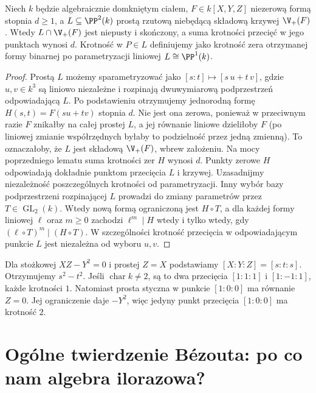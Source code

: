 \begin{twierdzenie}
\label{tw:bezout-line}
Niech $k$ będzie algebraicznie domkniętym ciałem,
$F\in k[X,Y,Z]$ niezerową formą stopnia $d\ge1$,
a $L\subseteq\PP^2(k)$ prostą rzutową niebędącą
składową krzywej $\V_+(F)$. Wtedy $L\cap\V_+(F)$
jest niepusty i skończony, a suma krotności przecięć
w jego punktach wynosi $d$. Krotność w $P\in L$
definiujemy jako krotność zera otrzymanej formy binarnej
po parametryzacji liniowej $L\cong\PP^1(k)$.
\end{twierdzenie}
\begin{proof}
Prostą $L$ możemy sparametryzować jako
$[s:t]\mapsto[s\,u+t\,v]$, gdzie $u,v\in k^3$
są liniowo niezależne i rozpinają dwuwymiarową
podprzestrzeń odpowiadającą $L$. Po podstawieniu
otrzymujemy jednorodną formę $H(s,t)=F(su+tv)$ stopnia $d$.
Nie jest ona zerowa, ponieważ w przeciwnym razie $F$
znikałby na całej prostej $L$, a jej równanie liniowe
dzieliłoby $F$ (po liniowej zmianie współrzędnych
byłaby to podzielność przez jedną zmienną). To oznaczałoby,
że $L$ jest składową $\V_+(F)$, wbrew założeniu.
Na mocy poprzedniego lematu suma krotności zer $H$
wynosi $d$. Punkty zerowe $H$ odpowiadają dokładnie
punktom przecięcia $L$ i krzywej.
Uzasadnijmy niezależność poszczególnych krotności od parametryzacji.
Inny wybór bazy podprzestrzeni rozpinającej $L$ prowadzi do
zmiany parametrów przez $T\in\operatorname{GL}_2(k)$.
Wtedy nową formą ograniczoną jest $H\circ T$,
a dla każdej formy liniowej $\ell$ oraz $m\ge0$
zachodzi $\ell^m\mid H$ wtedy i tylko wtedy, gdy
$(\ell\circ T)^m\mid(H\circ T)$.
W szczególności krotność przecięcia w odpowiadającym
punkcie $L$ jest niezależna od wyboru $u,v$.
\end{proof}

\begin{przyklad}
Dla stożkowej $XZ-Y^2=0$ i prostej $Z=X$ podstawiamy
$[X:Y:Z]=[s:t:s]$. Otrzymujemy $s^2-t^2$.
Jeśli $\operatorname{char}k\ne2$, są to dwa przecięcia
$[1:1:1]$ i $[1:-1:1]$, każde krotności $1$.
Natomiast prosta styczna w punkcie $[1:0:0]$ ma równanie
$Z=0$. Jej ograniczenie daje $-Y^2$, więc jedyny punkt
przecięcia $[1:0:0]$ ma krotność $2$.
\end{przyklad}

\section{Ogólne twierdzenie Bézouta: po co nam algebra ilorazowa?}

